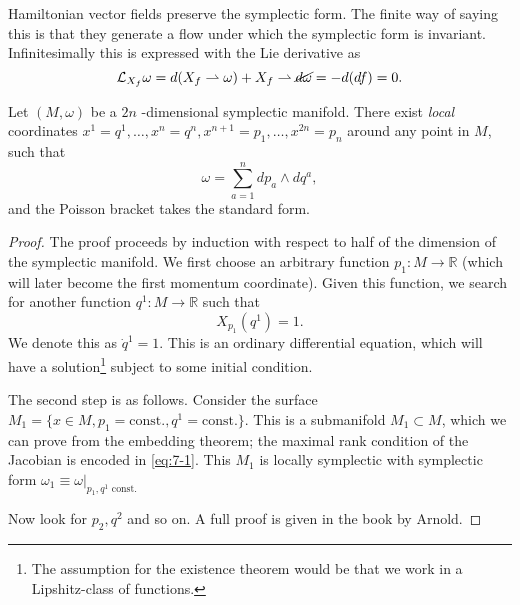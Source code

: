 Hamiltonian vector fields preserve the symplectic form.
The finite way of saying this is that they generate a flow under which the symplectic form is invariant.
Infinitesimally this is expressed with the Lie derivative as
\begin{equation}
  \mathcal{L}_{X_f} \omega = d(X_f \rightharpoonup \omega) + X_f \rightharpoonup \cancel{d\omega} = - d(df) = 0.
\end{equation}

\begin{theorem}[Darboux]
  Let $(M, \omega)$  be a $2n$ -dimensional symplectic manifold. There exist \emph{local} coordinates $x^1 = q^1, \dots, x^n = q^n, x^{n+1} = p_1, \dots, x^{2n} = p_n$ around any point in $M$, such that 
  \begin{equation}
    \omega = \sum_{a=1}^{n} dp_a \wedge dq^a,
  \end{equation}
  and the Poisson bracket takes the standard form.
\end{theorem}
\begin{proof}
  The proof proceeds by induction with respect to half of the dimension of the symplectic manifold.
  We first choose an arbitrary function $p_1 \colon M \to \mathbb{R}$ (which will later become the first momentum coordinate).
  Given this function, we search for another function $q^1 \colon M \to \mathbb{R}$ such that 
  \begin{equation}
    \label{eq:7-1}
    X_{p_1}(q^1) = 1.
  \end{equation}
  We denote this as $\dot q^1 = 1$.
  This is an ordinary differential equation, which will have a solution\footnote{The assumption for the existence theorem would be that we work in a Lipshitz-class of functions.} subject to some initial condition.

  The second step is as follows.
  Consider the surface $M_1 = \{x \in M, p_1 = \text{const.}, q^1 = \text{const.}\}$.
  This is a submanifold $M_1 \subset M$, which we can prove from the embedding theorem; the maximal rank condition of the Jacobian is encoded in \eqref{eq:7-1}.
  This $M_1$ is locally symplectic with symplectic form $\omega_1 \equiv \omega\rvert_{p_1, q^1 \text{ const.}}$

  Now look for $p_2, q^2$ and so on.
  A full proof is given in the book by Arnold.
\end{proof}

